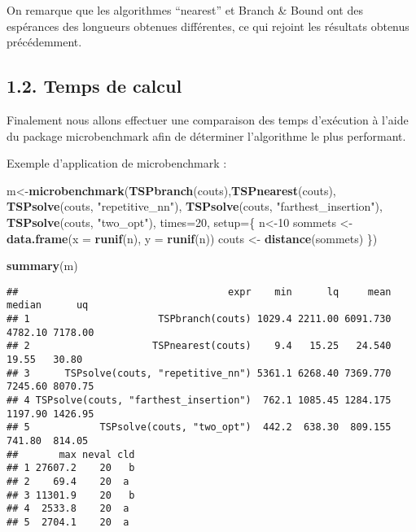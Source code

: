 \documentclass[
]{article}
\newenvironment{Shaded}{\begin{snugshade}}{\end{snugshade}}
\newcommand{\DataTypeTok}[1]{\textcolor[rgb]{0.13,0.29,0.53}{#1}}
\newcommand{\DecValTok}[1]{\textcolor[rgb]{0.00,0.00,0.81}{#1}}
\newcommand{\KeywordTok}[1]{\textcolor[rgb]{0.13,0.29,0.53}{\textbf{#1}}}
\newcommand{\NormalTok}[1]{#1}
\newcommand{\StringTok}[1]{\textcolor[rgb]{0.31,0.60,0.02}{#1}}
\begin{document}
On remarque que les algorithmes ``nearest'' et Branch \& Bound ont des
espérances des longueurs obtenues différentes, ce qui rejoint les
résultats obtenus précédemment.

\hypertarget{temps-de-calcul}{%
\subsection{1.2. Temps de calcul}\label{temps-de-calcul}}

Finalement nous allons effectuer une comparaison des temps d'exécution à
l'aide du package microbenchmark afin de déterminer l'algorithme le plus
performant.

Exemple d'application de microbenchmark :

\begin{Shaded}
\begin{Highlighting}[]
\NormalTok{m<-}\KeywordTok{microbenchmark}\NormalTok{(}\KeywordTok{TSPbranch}\NormalTok{(couts),}\KeywordTok{TSPnearest}\NormalTok{(couts), }\KeywordTok{TSPsolve}\NormalTok{(couts, }\StringTok{"repetitive_nn"}\NormalTok{), }\KeywordTok{TSPsolve}\NormalTok{(couts, }\StringTok{"farthest_insertion"}\NormalTok{), }\KeywordTok{TSPsolve}\NormalTok{(couts, }\StringTok{"two_opt"}\NormalTok{), }\DataTypeTok{times=}\DecValTok{20}\NormalTok{, }\DataTypeTok{setup=}\NormalTok{\{ n<-}\DecValTok{10}
\NormalTok{  sommets <-}\StringTok{ }\KeywordTok{data.frame}\NormalTok{(}\DataTypeTok{x =} \KeywordTok{runif}\NormalTok{(n), }\DataTypeTok{y =} \KeywordTok{runif}\NormalTok{(n))}
\NormalTok{  couts <-}\StringTok{ }\KeywordTok{distance}\NormalTok{(sommets)}
\NormalTok{\})}

\KeywordTok{summary}\NormalTok{(m)}
\end{Highlighting}
\end{Shaded}

\begin{verbatim}
##                                    expr    min      lq     mean  median      uq
## 1                      TSPbranch(couts) 1029.4 2211.00 6091.730 4782.10 7178.00
## 2                     TSPnearest(couts)    9.4   15.25   24.540   19.55   30.80
## 3      TSPsolve(couts, "repetitive_nn") 5361.1 6268.40 7369.770 7245.60 8070.75
## 4 TSPsolve(couts, "farthest_insertion")  762.1 1085.45 1284.175 1197.90 1426.95
## 5            TSPsolve(couts, "two_opt")  442.2  638.30  809.155  741.80  814.05
##       max neval cld
## 1 27607.2    20   b
## 2    69.4    20  a 
## 3 11301.9    20   b
## 4  2533.8    20  a 
## 5  2704.1    20  a
\end{verbatim}
\end{document}
